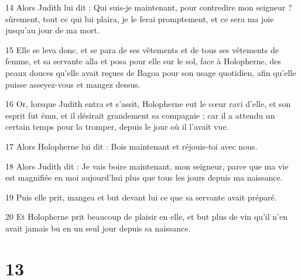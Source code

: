 \par 14 Alors Judith lui dit : Qui suis-je maintenant, pour contredire mon seigneur ? sûrement, tout ce qui lui plaira, je le ferai promptement, et ce sera ma joie jusqu'au jour de ma mort.
\par 15 Elle se leva donc, et se para de ses vêtements et de tous ses vêtements de femme, et sa servante alla et posa pour elle sur le sol, face à Holopherne, des peaux douces qu'elle avait reçues de Bagoa pour son usage quotidien, afin qu'elle puisse asseyez-vous et mangez dessus.
\par 16 Or, lorsque Judith entra et s'assit, Holopherne eut le cœur ravi d'elle, et son esprit fut ému, et il désirait grandement sa compagnie ; car il a attendu un certain temps pour la tromper, depuis le jour où il l'avait vue.
\par 17 Alors Holopherne lui dit : Bois maintenant et réjouis-toi avec nous.
\par 18 Alors Judith dit : Je vais boire maintenant, mon seigneur, parce que ma vie est magnifiée en moi aujourd'hui plus que tous les jours depuis ma naissance.
\par 19 Puis elle prit, mangea et but devant lui ce que sa servante avait préparé.
\par 20 Et Holopherne prit beaucoup de plaisir en elle, et but plus de vin qu'il n'en avait jamais bu en un seul jour depuis sa naissance.

\chapter{13}

